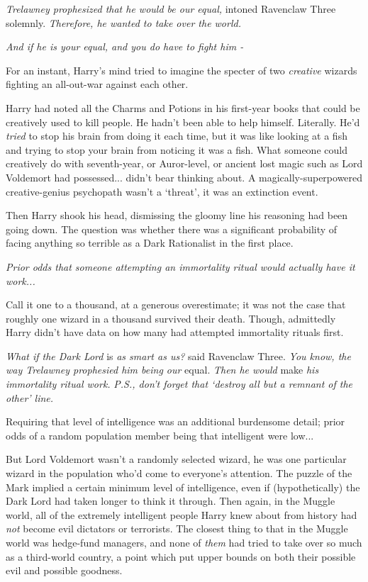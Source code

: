 \emph{Trelawney prophesized that he would be our equal,} intoned Ravenclaw Three solemnly. \emph{Therefore, he wanted to take over the world.}

\emph{And if he is your equal, and you do have to fight him -}

For an instant, Harry's mind tried to imagine the specter of two \emph{creative} wizards fighting an all-out-war against each other.

Harry had noted all the Charms and Potions in his first-year books that could be creatively used to kill people. He hadn't been able to help himself. Literally. He'd \emph{tried} to stop his brain from doing it each time, but it was like looking at a fish and trying to stop your brain from noticing it was a fish. What someone could creatively do with seventh-year, or Auror-level, or ancient lost magic such as Lord Voldemort had possessed... didn't bear thinking about. A magically-superpowered creative-genius psychopath wasn't a `threat', it was an extinction event.

Then Harry shook his head, dismissing the gloomy line his reasoning had been going down. The question was whether there was a significant probability of facing anything so terrible as a Dark Rationalist in the first place.

\emph{Prior odds that someone attempting an immortality ritual would actually have it work...}

Call it one to a thousand, at a generous overestimate; it was not the case that roughly one wizard in a thousand survived their death. Though, admittedly Harry didn't have data on how many had attempted immortality rituals first.

\emph{What if the Dark Lord} is \emph{as smart as us?} said Ravenclaw Three. \emph{You know, the way Trelawney prophesied him being our} equal. \emph{Then he would} make \emph{his immortality ritual work.} \emph{P.S., don't forget that `destroy all but a remnant of the other' line.}

Requiring that level of intelligence was an additional burdensome detail; prior odds of a random population member being that intelligent were low...

But Lord Voldemort wasn't a randomly selected wizard, he was one particular wizard in the population who'd come to everyone's attention. The puzzle of the Mark implied a certain minimum level of intelligence, even if (hypothetically) the Dark Lord had taken longer to think it through. Then again, in the Muggle world, all of the extremely intelligent people Harry knew about from history had \emph{not} become evil dictators or terrorists. The closest thing to that in the Muggle world was hedge-fund managers, and none of \emph{them} had tried to take over so much as a third-world country, a point which put upper bounds on both their possible evil and possible goodness.

